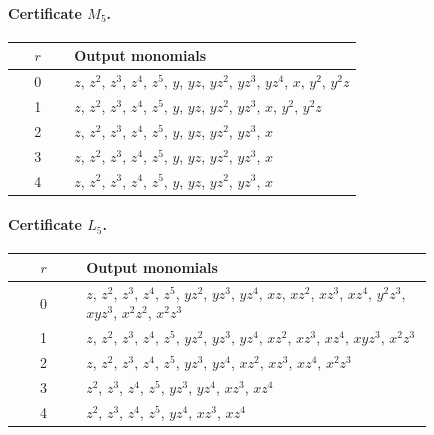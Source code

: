 \documentclass[11pt]{amsart}
\theoremstyle{definition}
\theoremstyle{remark}
\numberwithin{equation}{section}
\begin{document}
\paragraph{Certificate $M_{5}$.}\mbox{}
\begin{center}
\begin{tabular}{cp{0.83\linewidth}}
$r$ & Output monomials\\\hline
0 & \(z\), \(z^{2}\), \(z^{3}\), \(z^{4}\), \(z^{5}\), \(y\), \(yz\), \(yz^{2}\), \(yz^{3}\), \(yz^{4}\), \(x\), \(y^{2}\), \(y^{2}z\)\\
1 & \(z\), \(z^{2}\), \(z^{3}\), \(z^{4}\), \(z^{5}\), \(y\), \(yz\), \(yz^{2}\), \(yz^{3}\), \(x\), \(y^{2}\), \(y^{2}z\)\\
2 & \(z\), \(z^{2}\), \(z^{3}\), \(z^{4}\), \(z^{5}\), \(y\), \(yz\), \(yz^{2}\), \(yz^{3}\), \(x\)\\
3 & \(z\), \(z^{2}\), \(z^{3}\), \(z^{4}\), \(z^{5}\), \(y\), \(yz\), \(yz^{2}\), \(yz^{3}\), \(x\)\\
4 & \(z\), \(z^{2}\), \(z^{3}\), \(z^{4}\), \(z^{5}\), \(y\), \(yz\), \(yz^{2}\), \(yz^{3}\), \(x\)\\
\end{tabular}
\end{center}

\paragraph{Certificate $L_{5}$.}\mbox{}
\begin{center}
\begin{tabular}{cp{0.83\linewidth}}
$r$ & Output monomials\\\hline
0 & \(z\), \(z^{2}\), \(z^{3}\), \(z^{4}\), \(z^{5}\), \(yz^{2}\), \(yz^{3}\), \(yz^{4}\), \(xz\), \(xz^{2}\), \(xz^{3}\), \(xz^{4}\), \(y^{2}z^{3}\), \(xyz^{3}\), \(x^{2}z^{2}\), \(x^{2}z^{3}\)\\
1 & \(z\), \(z^{2}\), \(z^{3}\), \(z^{4}\), \(z^{5}\), \(yz^{2}\), \(yz^{3}\), \(yz^{4}\), \(xz^{2}\), \(xz^{3}\), \(xz^{4}\), \(xyz^{3}\), \(x^{2}z^{3}\)\\
2 & \(z\), \(z^{2}\), \(z^{3}\), \(z^{4}\), \(z^{5}\), \(yz^{3}\), \(yz^{4}\), \(xz^{2}\), \(xz^{3}\), \(xz^{4}\), \(x^{2}z^{3}\)\\
3 & \(z^{2}\), \(z^{3}\), \(z^{4}\), \(z^{5}\), \(yz^{3}\), \(yz^{4}\), \(xz^{3}\), \(xz^{4}\)\\
4 & \(z^{2}\), \(z^{3}\), \(z^{4}\), \(z^{5}\), \(yz^{4}\), \(xz^{3}\), \(xz^{4}\)\\
\end{tabular}
\end{center}
\end{document}
